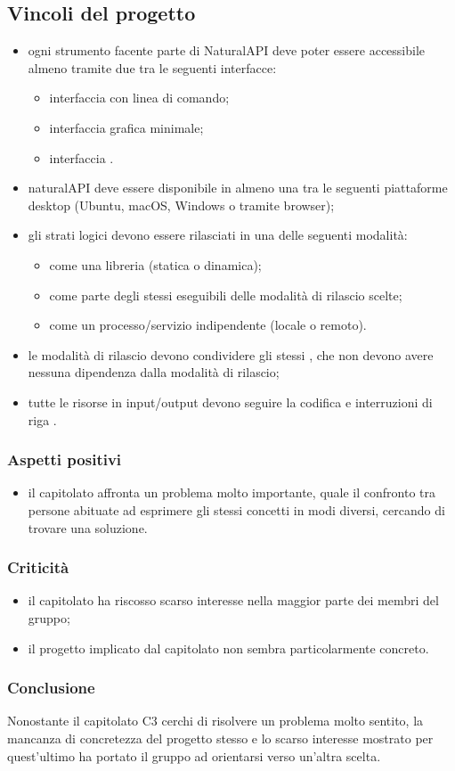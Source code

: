   \subsection{Vincoli del progetto}
   	\begin{itemize}
   		\item ogni strumento facente parte di NaturalAPI deve poter essere accessibile almeno tramite due tra le seguenti interfacce:
   			\begin{itemize}
   				\item interfaccia con linea di comando;
   				\item interfaccia grafica minimale;
   				\item interfaccia .
   			\end{itemize}
   			\item naturalAPI deve essere disponibile in almeno una tra le seguenti piattaforme desktop (Ubuntu, macOS, Windows o tramite browser);
   			\item gli strati logici devono essere rilasciati in una delle seguenti modalità:
   				\begin{itemize}
   					\item come una libreria (statica o dinamica);
   					\item come parte degli stessi eseguibili delle modalità di rilascio scelte;
   					\item come un processo/servizio indipendente (locale o remoto).
   				\end{itemize}
   			\item le modalità di rilascio devono condividere gli stessi , che non devono avere nessuna dipendenza dalla modalità di rilascio;
   			\item tutte le risorse in input/output devono seguire la codifica  e interruzioni di riga .
   	\end{itemize}

    \subsubsection{Aspetti positivi}
    \begin{itemize}
      \item il capitolato affronta un problema molto importante, quale il confronto tra persone abituate ad esprimere gli stessi concetti in modi diversi, cercando di trovare una soluzione.
    \end{itemize}
    \subsubsection{Criticità}
    \begin{itemize}
    		\item il capitolato ha riscosso scarso interesse nella maggior parte dei membri del gruppo;
    		\item il progetto implicato dal capitolato non sembra particolarmente concreto.
    \end{itemize}
    \subsubsection{Conclusione}
    Nonostante il capitolato C3 cerchi di risolvere un problema molto sentito, la mancanza di concretezza del progetto stesso e lo scarso interesse mostrato per quest'ultimo ha portato il gruppo ad orientarsi verso un'altra scelta.
